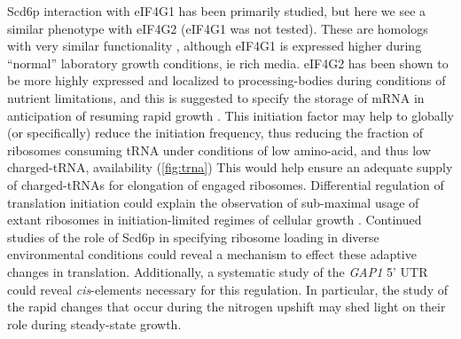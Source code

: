 Scd6p interaction with eIF4G1 has been primarily studied, 
but here we see a similar phenotype with eIF4G2 
(eIF4G1 was not tested). These are
homologs with very similar functionality
\parencite{clarkson2010functional}, 
although eIF4G1 is expressed higher
during “normal” laboratory growth conditions, ie rich media. 
eIF4G2 has been shown to be more highly expressed and localized to
processing-bodies during conditions of nutrient limitations, and
this is suggested to specify the storage of mRNA in anticipation of
resuming rapid growth \parencite{brengues2007accumulation}.
This initiation factor may help to globally (or specifically)
reduce the initiation frequency, thus reducing the fraction of
ribosomes consuming tRNA under conditions of low amino-acid,
and thus low charged-tRNA, availability (\autoref{fig:trna})
This would help ensure an adequate
supply of charged-tRNAs for elongation of engaged ribosomes.
Differential regulation of 
translation initiation could explain the observation of sub-maximal
usage of extant ribosomes in initiation-limited regimes of cellular
growth \parencite{kafri2016cost,metzl2017principles}.
Continued studies of the role of Scd6p in specifying ribosome
loading in diverse environmental conditions could reveal a mechanism
to effect these adaptive changes in translation.
Additionally, a systematic study of the \textit{GAP1} 5' UTR could
reveal \textit{cis}-elements necessary for this regulation.
In particular, the study of the rapid changes that occur during the
nitrogen upshift may shed light on their role during steady-state
growth.

\vspace{2em}

